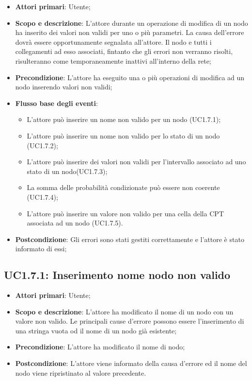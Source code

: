 \begin{itemize} 
	\item{\textbf{Attori primari}: Utente;} 
	\item{\textbf{Scopo e descrizione}: L'attore durante un operazione di modifica di un nodo ha inserito dei valori non validi per uno o più parametri. La causa dell'errore dovrà essere opportunamente segnalata all'attore. Il nodo e tutti i collegamenti ad esso associati, fintanto che gli errori non verranno risolti, risulteranno come temporaneamente inattivi all'interno della rete;} 
	\item{\textbf{Precondizione}: L'attore ha eseguito una o più operazioni di modifica ad un nodo inserendo valori non validi;} 
	\item{\textbf{Flusso base degli eventi}: } 
	\begin{itemize} 
		\item{L'attore può inserire un nome non valido per un nodo (UC1.7.1);} 
		\item{L'attore può inserire un nome non valido per lo stato di un nodo (UC1.7.2);} 
		\item{L'attore può inserire dei valori non validi per l'intervallo associato ad uno stato di un nodo(UC1.7.3);} 
		\item{La somma delle probabilità condizionate può essere non coerente (UC1.7.4);} 
		\item{L'attore può inserire un valore non valido per una cella della CPT associata ad un nodo (UC1.7.5).} 
	\end{itemize} 
	\item{\textbf{Postcondizione}: Gli errori sono stati gestiti correttamente e l'attore è stato informato di essi;} 
\end{itemize} 
\subsection{UC1.7.1: Inserimento nome nodo non valido} 
\hypertarget{UC1.7.1}{} 
\begin{itemize} 
	\item{\textbf{Attori primari}: Utente;} 
	\item{\textbf{Scopo e descrizione}: L'attore ha modificato il nome di un nodo con un valore non valido. Le principali cause d'errore possono essere l'inserimento di una stringa vuota od il nome di un nodo già esistente;} 
	\item{\textbf{Precondizione}: L'attore ha modificato il nome di nodo;} 
	\item{\textbf{Postcondizione}: L'attore viene informato della causa d'errore ed il nome del nodo viene ripristinato al valore precedente.} 
\end{itemize} 
